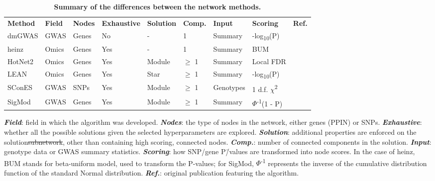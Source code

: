 \documentclass[10pt,letterpaper]{article}
\newlength\savedwidth
\newcommand\thickhline{\noalign{\global\savedwidth\arrayrulewidth\global\arrayrulewidth 2pt}%
\hline
\noalign{\global\arrayrulewidth\savedwidth}}
\providecommand{\DIFdeltex}[1]{{\protect\color{red}\sout{#1}}}                      %
\providecommand{\DIFdelFL}[1]{\DIFdel{#1}} %
\providecommand{\DIFdelbeginFL}{} %
\providecommand{\DIFdelendFL}{} %
\providecommand{\DIFdel}[1]{\texorpdfstring{\DIFdeltex{#1}}{}} %
\newcommand{\DIFscaledelfig}{0.5}
\newlength{\DIFdelgraphicswidth} %
\newlength{\DIFdelgraphicsheight} %
\newcommand{\DIFdelincludegraphics}[2][]{%
\sbox{\DIFdelgraphicsbox}{\DIFOincludegraphics[#1]{#2}}%
\settoboxwidth{\DIFdelgraphicswidth}{\DIFdelgraphicsbox} %
\settoboxtotalheight{\DIFdelgraphicsheight}{\DIFdelgraphicsbox} %
\scalebox{\DIFscaledelfig}{%
\parbox[b]{\DIFdelgraphicswidth}{\usebox{\DIFdelgraphicsbox}\\[-\baselineskip] \rule{\DIFdelgraphicswidth}{0em}}\llap{\resizebox{\DIFdelgraphicswidth}{\DIFdelgraphicsheight}{%
\setlength{\unitlength}{\DIFdelgraphicswidth}%
\begin{picture}(1,1)%
\thicklines\linethickness{2pt} %
{\color[rgb]{1,0,0}\put(0,0){\framebox(1,1){}}}%
{\color[rgb]{1,0,0}\put(0,0){\line( 1,1){1}}}%
{\color[rgb]{1,0,0}\put(0,1){\line(1,-1){1}}}%
\end{picture}%
}\hspace*{3pt}}} %
} %
\DeclareRobustCommand{\DIFdelbeginFL}{\DIFOdelbeginFL \let\includegraphics\DIFdelincludegraphics} %
\DeclareRobustCommand{\DIFdelendFL}{\DIFOaddendFL \let\includegraphics\DIFOincludegraphics} %
\begin{document}
\begin{table}[!ht]
  \begin{adjustwidth}{-2.25in}{0in} %
  \centering
  \caption{
  {\bf Summary of the differences between the network methods.}}
  \begin{tabular}{l|llllllll}
  {\bf Method} & {\bf Field } & {\bf Nodes} & {\bf Exhaustive} & {\bf Solution} & {\bf Comp.} & {\bf Input} & {\bf Scoring} & {\bf Ref.}\\ \thickhline
  dmGWAS & GWAS & Genes & No & - & 1 & Summary & -log\textsubscript{10}(P) & \cite{jia_dmgwas:_2011}\\
  heinz & Omics & Genes & Yes & - & 1 & Summary & BUM & \cite{dittrich_identifying_2008}\\
  HotNet2 & Omics & Genes & Yes & Module & \(\ge\) 1 & Summary & Local FDR & \cite{leiserson_pan-cancer_2015}\\
  LEAN & Omics & Genes & Yes & Star & \(\ge\) 1 & Summary & -log\textsubscript{10}(P) & \cite{gwinner_network-based_2016}\\
  SConES & GWAS & SNPs & Yes & Module & \(\ge\) 1 & Genotypes & 1 d.f. \(\chi\)\textsuperscript{2} & \cite{azencott_efficient_2013}\\
  SigMod & GWAS & Genes & Yes & Module & \(\ge\) 1 & Summary & $\Phi$\textsuperscript{-1}(1 - P) & \cite{liu_sigmod:_2017}\\
  \end{tabular}
  \begin{flushleft} \textbf{\emph{Field}}: field in which the algorithm was developed. \textbf{\emph{Nodes}}: the type of nodes in the network, either genes (PPIN) or SNPs. \textbf{\emph{Exhaustive}}: whether all the possible solutions given the selected hyperparameters are explored. \textbf{\emph{Solution}}: additional properties are enforced on the solution\DIFdelbeginFL \DIFdelFL{subnetwork}\DIFdelendFL , other than containing high scoring, connected nodes. \textbf{\emph{Comp.}}: number of connected components in the solution. \textbf{\emph{Input}}: genotype data or GWAS summary statistics. \textbf{\emph{Scoring}}: how SNP/gene P\=/values are transformed into node scores. In the case of heinz, BUM stands for beta-uniform model, used to transform the P-values; for SigMod, $\Phi$\textsuperscript{-1} represents the inverse of the cumulative distribution function of the standard Normal distribution. \textbf{\emph{Ref.}}: original publication featuring the algorithm.
  \end{flushleft}
  \label{tab:method_comparison}
  \end{adjustwidth}
\end{table}
\end{document}
